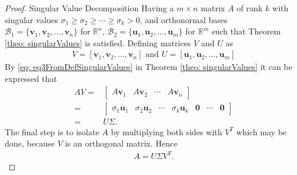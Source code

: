 \begin{proof}{Singular Value Decomposition}
    Having a $m \times n$ matrix $A$ of rank $k$ with singular values $\sigma_1 \geq \sigma_2 \geq \cdots \geq \sigma_k > 0$, and orthonormal bases $\mathcal{B}_1=\{\mathbf{v}_1, \mathbf{v}_2,..., \mathbf{v}_n\}$ for $\mathbb{R}^n$, $\mathcal{B}_2=\{\mathbf{u}_1, \mathbf{u}_2,..., \mathbf{u}_m\}$ for $\mathbb{R}^m$ such that Theorem \ref{theo: singularValues} is satisfied. Defining matrices $V$ and $U$ as 
    \begin{align}
        V = [\mathbf{v}_1, \mathbf{v}_2,..., \mathbf{v}_n] \text{ and } U = [\mathbf{u}_1, \mathbf{u}_2,..., \mathbf{u}_m]
    \end{align}
    By \eqref{eq: eq3FromDefSingularValues} in Theorem \ref{theo: singularValues} it can be expressed that
    \begin{align*}
        AV=& \begin{bmatrix}
        A\mathbf{v}_1 & A\mathbf{v}_2 & \cdots & A\mathbf{v}_n
        \end{bmatrix}\\
        =& \begin{bmatrix}
        \sigma_1\mathbf{u}_1 & \sigma_2\mathbf{u}_2 & \cdots & \sigma_k\mathbf{u}_k & \mathbf{0} & \cdots & \mathbf{0}
        \end{bmatrix}\\
        =&U\Sigma. 
    \end{align*}
    The final step is to isolate $A$ by multiplying both sides with $V^T$  which may be done, because $V$ is an orthogonal matrix. Hence
    \begin{align*}
        A=U\Sigma V^T.
    \end{align*} \cite[444-445]{LiAl} \qedsymbol
\end{proof}

